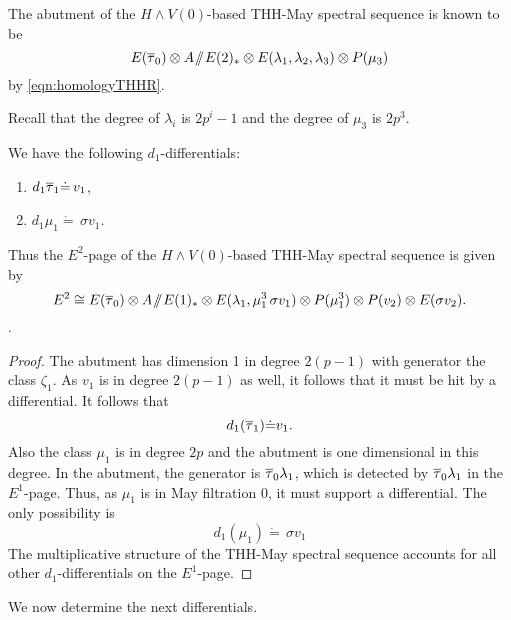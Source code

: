 The abutment of the $H\wedge V(0)$-based THH-May spectral sequence is known to be 
\[
E(\overline{\tau}_0)\otimes A\! \sslash \! E(2)_*\otimes E(\lambda_1, \lambda_2, \lambda_3)\otimes P(\mu_3)
\]
by \eqref{eqn:homologyTHHR}.

Recall that the degree of $\lambda_i$ is $2p^i-1$ and the degree of $\mu_3$ is $2p^3$.

\begin{prop}
	We have the following $d_1$-differentials:
	\begin{enumerate}
		\item $d_1\overline{\tau}_1\dot{=}\, v_1$,
		\item $d_1\mu_1\dot{=}\, \sigma v_1$.
	\end{enumerate}
	Thus the $E^2$-page of the $H\wedge V(0)$-based THH-May spectral sequence is given by 
	\[
	E^2\cong E(\overline{\tau}_0)\otimes A\! \sslash \! E(1)_*\otimes E(\lambda_1, \mu_1^3\, \sigma v_1)\otimes P(\mu_1^3)\otimes P(v_2)\otimes E(\sigma v_2).
	\].
\end{prop}
\begin{proof}
	The abutment has dimension 1 in degree $2(p-1)$ with generator the class $\zeta_1$. As $v_1$ is in degree $2(p-1)$ as well, it follows that it must be hit by a differential. It follows that 
\[
d_1(\overline{\tau}_1) \dot{=} v_1.
\]
Also the class $\mu_1$ is in degree $2p$ and the abutment is one dimensional in this degree. In the abutment, the generator is $\overline{\tau}_0\lambda_1$, which is detected by $\overline{\tau}_0\lambda_1$ in the $E^1$-page. Thus, as $\mu_1$ is in May filtration 0, it must support a differential. The only possibility is 
\[
d_1(\mu_1)\dot{=}\,\sigma v_1
\]
The multiplicative structure of the THH-May spectral sequence accounts for all other $d_1$-differentials on the $E^1$-page.
\end{proof}

We now determine the next differentials. 

